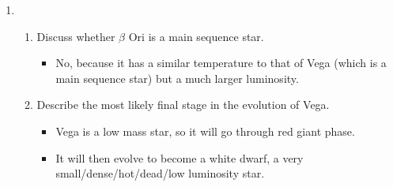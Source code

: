 \documentclass[a4paper,12pt]{article}
\begin{document}
\begin{enumerate}[label=(\alph*)]
  \item
        \begin{enumerate}[label=(\roman*)]
          \item Discuss whether $\beta$ Ori is a main sequence star.
                \begin{itemize}
                  \item No, because it has a similar temperature to that of Vega (which is a main sequence star) but a much larger luminosity.
                \end{itemize}
          \item Describe the most likely final stage in the evolution of Vega.
                \begin{itemize}
                  \item Vega is a low mass star, so it will go through red giant phase.
                  \item It will then evolve to become a white dwarf, a very small/dense/hot/dead/low luminosity star.

                \end{itemize}
        \end{enumerate}

\end{enumerate}
\end{document}

